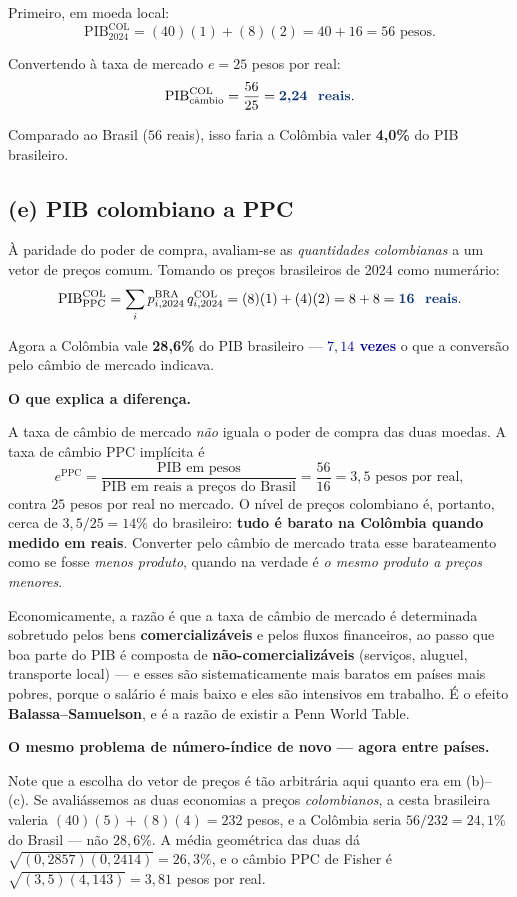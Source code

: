 \documentclass[11pt, a4paper]{article}
\newcommand{\passo}[1]{\medskip\noindent\textbf{#1}\par\nobreak}
\newcommand{\resp}[1]{\textcolor{darkblue}{\textbf{#1}}}
\begin{document}
Primeiro, em moeda local:
$$\text{PIB}^{\text{COL}}_{2024} = (40)(1) + (8)(2) = 40 + 16 = 56 \text{ pesos}.$$

Convertendo à taxa de mercado $e = 25$ pesos por real:
$$\text{PIB}^{\text{COL}}_{\text{câmbio}} = \frac{56}{25} = \resp{2{,}24 \text{ reais}}.$$

Comparado ao Brasil ($56$ reais), isso faria a Colômbia valer \textbf{4,0\%} do PIB
brasileiro.

\subsection*{(e) PIB colombiano a PPC}

À paridade do poder de compra, avaliam-se as \emph{quantidades colombianas} a um vetor de
preços comum. Tomando os preços brasileiros de 2024 como numerário:
$$\text{PIB}^{\text{COL}}_{\text{PPC}} = \sum_i p^{\text{BRA}}_{i,2024}\, q^{\text{COL}}_{i,2024}
= (8)(1) + (4)(2) = 8 + 8 = \resp{16 \text{ reais}}.$$

Agora a Colômbia vale \textbf{28,6\%} do PIB brasileiro --- \resp{$7{,}14$ vezes} o que a
conversão pelo câmbio de mercado indicava.

\passo{O que explica a diferença.} A taxa de câmbio de mercado \emph{não} iguala o poder
de compra das duas moedas. A taxa de câmbio PPC implícita é
$$e^{\text{PPC}} = \frac{\text{PIB em pesos}}{\text{PIB em reais a preços do Brasil}}
= \frac{56}{16} = 3{,}5 \text{ pesos por real},$$
contra $25$ pesos por real no mercado. O nível de preços colombiano é, portanto, cerca de
$3{,}5/25 = 14\%$ do brasileiro: \textbf{tudo é barato na Colômbia quando medido em
reais}. Converter pelo câmbio de mercado trata esse barateamento como se fosse
\emph{menos produto}, quando na verdade é \emph{o mesmo produto a preços menores}.

Economicamente, a razão é que a taxa de câmbio de mercado é determinada sobretudo pelos
bens \textbf{comercializáveis} e pelos fluxos financeiros, ao passo que boa parte do PIB
é composta de \textbf{não-comercializáveis} (serviços, aluguel, transporte local) --- e
esses são sistematicamente mais baratos em países mais pobres, porque o salário é mais
baixo e eles são intensivos em trabalho. É o efeito \textbf{Balassa--Samuelson}, e é a
razão de existir a Penn World Table.

\passo{O mesmo problema de número-índice de novo --- agora entre países.} Note que a
escolha do vetor de preços é tão arbitrária aqui quanto era em (b)--(c). Se avaliássemos
as duas economias a preços \emph{colombianos}, a cesta brasileira valeria
$(40)(5)+(8)(4) = 232$ pesos, e a Colômbia seria $56/232 = 24{,}1\%$ do Brasil --- não
$28{,}6\%$. A média geométrica das duas dá $\sqrt{(0{,}2857)(0{,}2414)} = 26{,}3\%$, e o
câmbio PPC de Fisher é $\sqrt{(3{,}5)(4{,}143)} = 3{,}81$ pesos por real.
\end{document}
